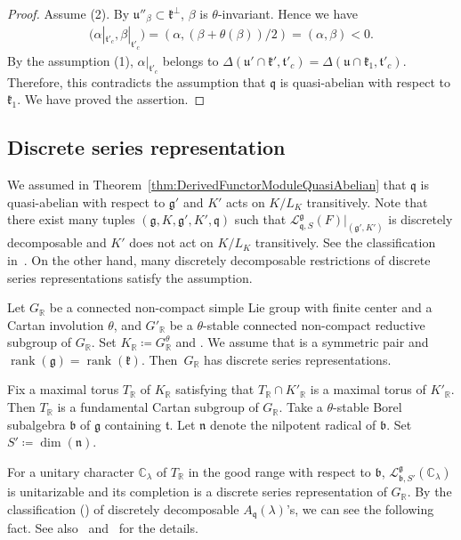 \documentclass[pdftex]{sigma}
\numberwithin{equation}{section}
\theoremstyle{definition}
\newcommand{\BasicRing}[1]{\mathbb{#1}}
\newcommand{\RR}{\BasicRing{R}}
\newcommand{\CC}{\BasicRing{C}}
\DeclareMathOperator{\rank}{rank}
\newcommand{\lie}[1]{\mathfrak{#1}}
\newcommand{\lmod}[3]{\mathcal{L}^{\lie{#1}}_{\lie{#2}, #3}}
\begin{document}
\begin{proof}
	Assume (2).
	By $\lie{u}''_{\beta} \subset \lie{k}^{\perp}$, $\beta$ is $\theta$-invariant.
	Hence we have
	\begin{align*}
	\bigl(\alpha|_{\lie{t}'_{c}}, \beta|_{\lie{t}'_{c}}\bigr) = (\alpha, (\beta + \theta(\beta)) / 2) = (\alpha, \beta) < 0. %
	\end{align*}
	By the assumption (1), $\alpha|_{\lie{t}'_{c}}$ belongs to $\Delta(\lie{u}'\cap \lie{k'}, \lie{t}'_{c}) = \Delta(\lie{u}\cap \lie{k}_1, \lie{t}'_c)$.
	Therefore, this contradicts the assumption that $\lie{q}$ is quasi-abelian with respect to $\lie{k}_1$.
	We have proved the assertion.
\end{proof}

\subsection{Discrete series representation}

We assumed in Theorem~\ref{thm:DerivedFunctorModuleQuasiAbelian} that $\lie{q}$ is quasi-abelian with respect to $\lie{g}'$ and $K'$ acts on $K/L_K$ transitively.
Note that there exist many tuples $(\lie{g}, K, \lie{g'}, K', \lie{q})$ such that $\lmod{g}{q}{S}(F)|_{(\lie{g}', K')}$ is discretely decomposable and $K'$ does not act on $K/L_K$ transitively.
See the classification in~\cite{KoOs12}.
On the other hand, many discretely decomposable restrictions of discrete series representations satisfy the assumption.

Let $G_\RR$ be a connected non-compact simple Lie group with finite center and a Cartan involution $\theta$,
and $G'_{\RR}$ be a $\theta$-stable connected non-compact reductive subgroup of $G_{\RR}$.
Set $K_{\RR}\coloneq G^{\theta}_{\RR}$ and \smash{$K'_{\RR}\coloneq \bigl(G'_{\RR}\bigr)^{\theta}$}.
We assume that \smash{$\bigl(G_{\RR}, G'_{\RR}\bigr)$} is a symmetric pair and $\rank(\lie{g}) = \rank(\lie{k})$.
Then~$G_\RR$ has discrete series representations.

Fix a maximal torus $T_{\RR}$ of $K_{\RR}$ satisfying that $T_{\RR} \cap K'_{\RR}$ is a maximal torus of $K'_{\RR}$.
Then $T_{\RR}$ is a fundamental Cartan subgroup of $G_{\RR}$.
Take a $\theta$-stable Borel subalgebra $\lie{b}$ of $\lie{g}$ containing $\lie{t}$.
Let $\lie{n}$ denote the nilpotent radical of $\lie{b}$.
Set $S'\coloneq \dim(\lie{n})$.

For a unitary character $\CC_{\lambda}$ of $T_{\RR}$ in the good range with respect to $\lie{b}$,
$\lmod{g}{b}{S'}(\CC_{\lambda})$ is unitarizable and its completion is a discrete series representation of $G_{\RR}$.
By the classification (\cite{KoOs12}) of discretely decomposable $A_{\lie{q}}(\lambda)$'s,
we can see the following fact.
See also~\cite{DuVa10} and~\cite[Section 8]{Os24} for the details.
\end{document}
